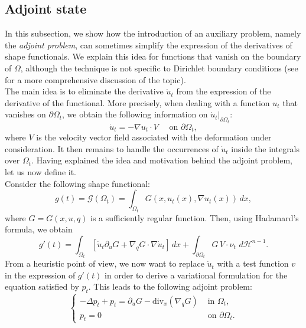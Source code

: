 \documentclass[oneside,a4paper,11pt,notitlepage]{article}
\newcommand{\dH}{\,d\mathcal{H}^{n-1}}
\theoremstyle{definition}
\theoremstyle{plain}
\theoremstyle{definition}
\begin{document}
\subsection{Adjoint state}
In this subsection, we show how the introduction of an auxiliary problem, namely the \emph{adjoint problem}, can sometimes simplify the expression of the derivatives of shape functionals. We explain this idea for functions that vanish on the boundary of $\Omega$, although the technique is not specific to Dirichlet boundary conditions (see \cite[\S 5.8]{HP} for a more comprehensive discussion of the topic).\\
The main idea is to eliminate the derivative $\dot{u}_t$ from the expression of the derivative of the functional. More precisely, when dealing with a function $u_t$ that vanishes on $\partial\Omega_t$, we obtain the following information on $\dot{u}_t|_{\partial\Omega_t}$:
\begin{equation*}
    \dot{u}_t=-\nabla u_t\cdot V \quad \text{ on } \partial\Omega_t,
\end{equation*}
where $V$ is the velocity vector field associated with the deformation under consideration. It then remains to handle the occurrences of $\dot{u}_t$ inside the integrals over $\Omega_t$. Having explained the idea and motivation behind the adjoint problem, let us now define it.\\
Consider the following shape functional:
\begin{equation*}
    g(t)=\mathcal{G}(\Omega_t)=\int_{\Omega_t} G(x,u_t(x),\nabla u_t(x))\,dx,
\end{equation*}
where $G=G(x,u,q)$ is a sufficiently regular function. Then, using Hadamard's formula, we obtain
\begin{equation}\label{SECADJ}
    g'(t)=\int_{\Omega_t}[\dot{u}_t\partial_u G+\nabla_q G\cdot\nabla\dot{u}_t]\,dx+\int_{\partial\Omega_t}G \, V\cdot\nu_t\,\dH.
\end{equation}
From a heuristic point of view, we now want to replace $\dot{u}_t$ with a test function $v$ in the expression of $g'(t)$ in order to derive a variational formulation for the equation satisfied by $p_t$. This leads to the following adjoint problem:
\begin{equation*}
    \begin{cases}
        -\Delta p_t+p_t=\partial_u G-\mathrm{div}_x(\nabla_q G) & \text{ in }\Omega_t,\\
        p_t=0 & \text{ on } \partial\Omega_t.
    \end{cases}
\end{equation*}
\end{document}
